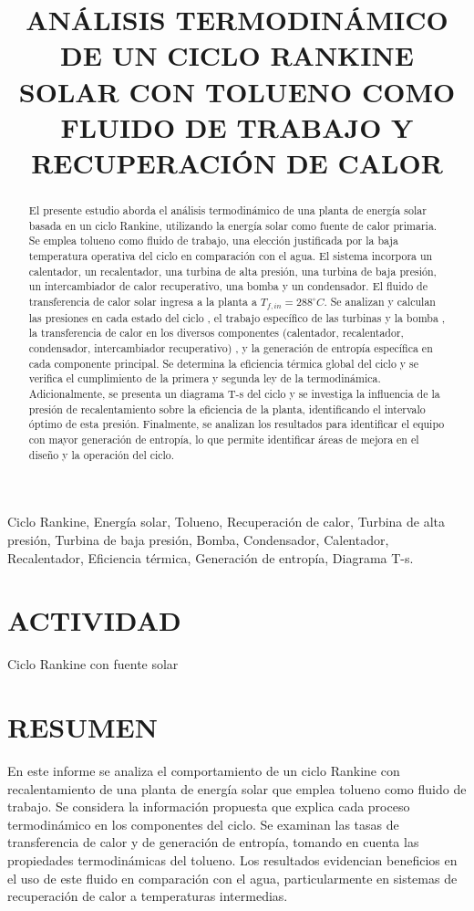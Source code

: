 \documentclass[conference]{IEEEtran}
\author{\IEEEauthorblockN{Daniel Fernando Aranda Contreras, Jeremy Carreño Fontalvo,\\ Santiago Silva Quintero}
\IEEEauthorblockA{Escuela E3T, Universidad Industrial de Santander\\
Correo electrónico: \{daniel2221648, jeremy2221647, santiago2231685\}@correo.uis.edu.co}}
\theoremstyle{mytheoremstyle}
\theoremstyle{mytheoremstyle}
\theoremstyle{myproblemstyle}
\begin{document}
\title{\uppercase{Análisis Termodinámico de un Ciclo Rankine Solar con Tolueno como Fluido de Trabajo y Recuperación de Calor}}
\maketitle
\begin{IEEEkeywords}
    Ciclo Rankine, Energía solar, Tolueno, Recuperación de calor, Turbina de alta presión, Turbina de baja presión, Bomba, Condensador, Calentador, Recalentador, Eficiencia térmica, Generación de entropía, Diagrama T-s.
\end{IEEEkeywords}


\begin{abstract}
    El presente estudio aborda el análisis termodinámico de una planta de energía solar basada en un ciclo Rankine, utilizando la energía solar como fuente de calor primaria. Se emplea tolueno como fluido de trabajo, una elección justificada por la baja temperatura operativa del ciclo en comparación con el agua. El sistema incorpora un calentador, un recalentador, una turbina de alta presión, una turbina de baja presión, un intercambiador de calor recuperativo, una bomba y un condensador. El fluido de transferencia de calor solar ingresa a la planta a $T_{f,in} = 288^{\circ}C$. Se analizan y calculan las presiones en cada estado del ciclo , el trabajo específico de las turbinas y la bomba , la transferencia de calor en los diversos componentes (calentador, recalentador, condensador, intercambiador recuperativo) , y la generación de entropía específica en cada componente principal. Se determina la eficiencia térmica global del ciclo  y se verifica el cumplimiento de la primera y segunda ley de la termodinámica. Adicionalmente, se presenta un diagrama T-s del ciclo  y se investiga la influencia de la presión de recalentamiento sobre la eficiencia de la planta, identificando el intervalo óptimo de esta presión. Finalmente, se analizan los resultados para identificar el equipo con mayor generación de entropía, lo que permite identificar áreas de mejora en el diseño y la operación del ciclo.
\end{abstract}

\section*{ACTIVIDAD}
Ciclo Rankine con fuente solar 

\section*{RESUMEN}
En este informe se analiza el comportamiento de un ciclo Rankine con recalentamiento de una planta de energía solar que emplea tolueno como fluido de trabajo. Se considera la información propuesta que explica cada proceso termodinámico en los componentes del ciclo. Se examinan las tasas de transferencia de calor y de generación de entropía, tomando en cuenta las propiedades termodinámicas del tolueno. Los resultados evidencian beneficios en el uso de este fluido en comparación con el agua, particularmente en sistemas de recuperación de calor a temperaturas intermedias.
\end{document}

